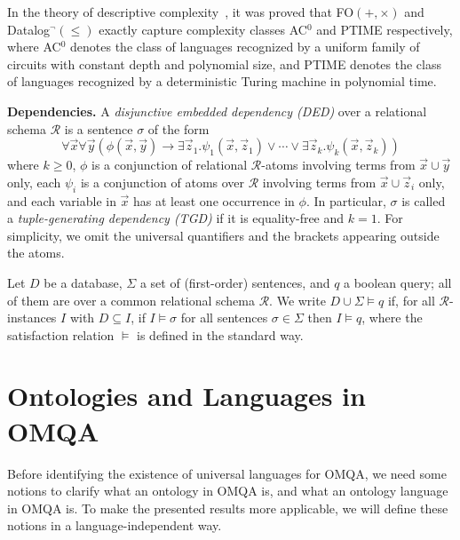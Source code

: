 \documentclass[letterpaper]{article} %
\theoremstyle{definition}
\theoremstyle{remark}
\theoremstyle{definition}
\begin{document}
In the theory of descriptive complexity~\cite{Immerman99}, it was proved that {FO}$(+,\times)$ and {Datalog}$^\neg(\le)$ exactly capture complexity classes {AC}$^0$ and PTIME respectively, where {AC}$^0$ denotes the class of languages recognized by a uniform family of circuits with constant depth and polynomial size, and {PTIME} denotes the class of languages recognized by a deterministic Turing machine in polynomial time.

\medskip
{\noindent\bf Dependencies.} A {\em disjunctive embedded dependency (DED)} over a relational schema $\mathscr{R}$ is a sentence $\sigma$ of the form
\begin{equation*}
\forall\vec{x}\forall\vec{y}(\phi(\vec{x},\vec{y})\rightarrow\exists\vec{z}_1.\psi_1(\vec{x},\vec{z}_1)\vee\cdots\vee\exists\vec{z}_k.\psi_k(\vec{x},\vec{z}_k))
\end{equation*}
where $k\ge 0$, $\phi$ is a conjunction of relational $\mathscr{R}$-atoms involving terms from $\vec{x}\cup\vec{y}$ only, each $\psi_i$ is a conjunction of atoms over $\mathscr{R}$ involving terms from $\vec{x}\cup\vec{z}_i$ only, and each variable in $\vec{x}$ has at least one occurrence in $\phi$. In particular, $\sigma$ is called a {\em tuple-generating dependency (TGD)} if it is equality-free and $k=1$. For simplicity, we omit the universal quantifiers and the brackets appearing outside the atoms.

Let $D$ be a database, $\Sigma$ a set of (first-order) sentences, and ${q}$ a boolean query; all of them are over a common relational schema $\mathscr{R}$. We write $D\cup\Sigma\vDash{q}$ if, for all $\mathscr{R}$-instances $I$ with $D\subseteq I$, if $I\models\sigma$ for all sentences $\sigma\in\Sigma$ then $I\models{q}$, where the satisfaction relation $\models$ is defined in the standard way. 

\section{Ontologies and Languages in OMQA}

Before identifying the existence of universal languages for OMQA, we need some notions to clarify what an ontology in OMQA is, and what an ontology language in OMQA is. To make the presented results more applicable, we will define these notions in a language-independent way.
\end{document}
